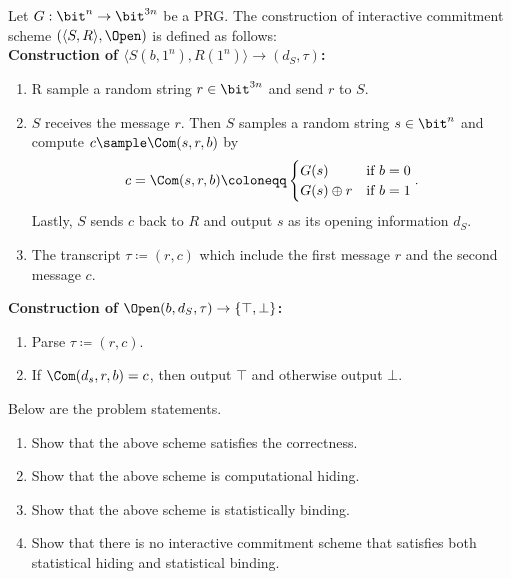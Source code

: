 \begin{problem}\label{p6}
    \leavevmode\par
    Let $G:\bit^n\to\bit^{3n}$ be a PRG. The construction of interactive commitment scheme $(\langle S, R\rangle, \Open)$ is defined as follows:\\
    \textbf{Construction of $\langle S(b,1^n),R(1^n)\rangle \to (d_S,\tau)$:}
    \begin{enumerate}
        \item R sample a random string $r\in\bit^{3n}$ and send $r$ to $S$.
        \item $S$ receives the message $r$. Then $S$ samples a random string $s\in\bit^n$ and compute $c\sample \Com(s,r,b)$ by
        \[
            c=\Com(s,r,b)\coloneqq\begin{cases}
                G(s) &\textrm{if } b=0\\
                G(s)\oplus r &\textrm{if } b=1
            \end{cases}.
        \]
        Lastly, $S$ sends $c$ back to $R$ and output $s$ as its opening information $d_S$.
        \item The transcript $\tau\coloneqq(r,c)$ which include the first message $r$ and the second message $c$.
    \end{enumerate}
    \textbf{Construction of $\Open(b,d_S,\tau) \to \{\top,\bot\}$:}
    \begin{enumerate}
        \item Parse $\tau\coloneqq (r,c)$.
        \item If $\Com(d_s,r,b)=c$, then output $\top$ and otherwise output $\bot$.
    \end{enumerate}
    Below are the problem statements.
    \begin{enumerate}[label=(\alph*)]
        \item Show that the above scheme satisfies the correctness.
        \item Show that the above scheme is computational hiding.
        \item Show that the above scheme is statistically binding.
        \item Show that there is no interactive commitment scheme that satisfies both statistical hiding and statistical binding.
    \end{enumerate}
\end{problem}




